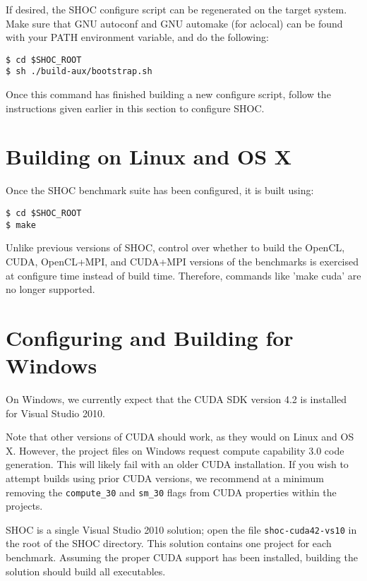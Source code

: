 \documentclass[11pt]{article}
\begin{document}
If desired, the SHOC configure script can be regenerated on the target system.
Make sure that GNU autoconf and GNU automake (for aclocal) can be found with
your PATH environment variable, and do the following:

\begin{Verbatim}[frame=single]
$ cd $SHOC_ROOT
$ sh ./build-aux/bootstrap.sh
\end{Verbatim}

Once this command has finished building a new configure script, follow the
instructions given earlier in this section to configure SHOC.

\section{Building on Linux and OS X}\label{sec:building}

Once the SHOC benchmark suite has been configured, it is built using:

\begin{Verbatim}[frame=single]
$ cd $SHOC_ROOT
$ make
\end{Verbatim}

Unlike previous versions of SHOC, control over whether to build the 
OpenCL, CUDA, OpenCL+MPI, and CUDA+MPI versions of the benchmarks is
exercised at configure time instead of build time.
Therefore, commands like 'make cuda' are no longer supported.

\section{Configuring and Building for Windows}\label{sec:windows}

On Windows, we currently expect that the CUDA SDK version 4.2
is installed for Visual Studio 2010.

Note that other versions
of CUDA should work, as they would on Linux and OS X.
However, the project files on Windows request compute capability 3.0
code generation.  This will likely fail with an older
CUDA installation.  If you wish to attempt builds using
prior CUDA versions, we recommend at a minimum
removing the \verb+compute_30+ and \verb+sm_30+ flags from CUDA properties
within the projects.

SHOC is a single Visual Studio 2010 solution; open
the file {\tt shoc-cuda42-vs10} in the root 
of the SHOC directory.  This solution contains
one project for each benchmark.  Assuming
the proper CUDA support has been installed,
building the solution should build all executables.
\end{document}
